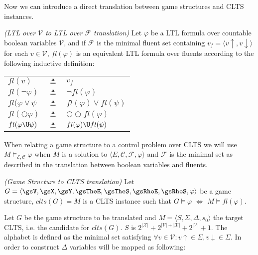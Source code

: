 Now we can introduce a direct translation between game structures and CLTS instances.

\begin{definition}
	\label{def:fl_ltl} \emph{(LTL over $\mathcal{V}$ to LTL over $\mathcal{F}$ translation)} 
	Let $\varphi$ be a LTL formula over countable boolean variables $\mathcal{V}$, and if $\mathcal{F}$ is the minimal fluent set containing $v_f = \langle v\uparrow, v\downarrow \rangle$ for each $v \in \mathcal{V}$, $fl(\varphi)$ is an equivalent LTL formula over fluents according to the following inductive definition:\\
	
\begin{tabular}{ l c l }
	$fl(v)$ & $\triangleq$ & $v_f$\\	
	$fl(\neg \varphi)$ & $\triangleq$ & $\neg fl(\varphi)$\\
	$fl(\varphi \vee \psi$ & $\triangleq$ & $fl(\varphi) \vee fl(\psi)$\\
	$fl(\bigcirc \varphi)$ & $\triangleq$ & $\bigcirc\bigcirc fl(\varphi)$\\
	$fl(\varphi \U \psi)$ & $\triangleq$ & $fl(\varphi) \U fl(\psi)$\\
\end{tabular}	
\end{definition}

When relating a game structure to a control problem over CLTS we will use $M \models_{\mathcal{E,C}}\varphi$ when $M$ is a solution to $\langle E, \mathcal{C}, \mathcal{F}, \varphi \rangle$ and $\mathcal{F}$ is the minimal set as described in the translation between boolean variables and fluents.

\begin{definition}
	\label{def:gs_to_clts_translation} \emph{(Game Structure to CLTS translation)} 
Let $G =  \langle \gsV, \gsX, \gsY, \gsTheE, \gsTheS, \gsRhoE, \gsRhoS, \varphi \rangle$ be a game structure, $clts(G)=M$ is a CLTS instance such that $G \models \varphi$ $\iff$ $M \models fl(\varphi)$.
\end{definition}

Let $G$ be the game structure to be translated and $M=\langle S, \Sigma, \Delta, s_0 \rangle$ the target CLTS, i.e. the candidate for $clts(G)$. 
$S$ is $2^{|\mathcal{X}|}+2^{|\mathcal{V}|+|\mathcal{X}|}+2^{|\mathcal{V}|}+1$.
The alphabet is defined as the minimal set satisfying 
$\forall v \in \mathcal{V}: v\uparrow \in \Sigma, v\downarrow \in \Sigma$. 
In order to construct $\Delta$ variables will be mapped as following:


